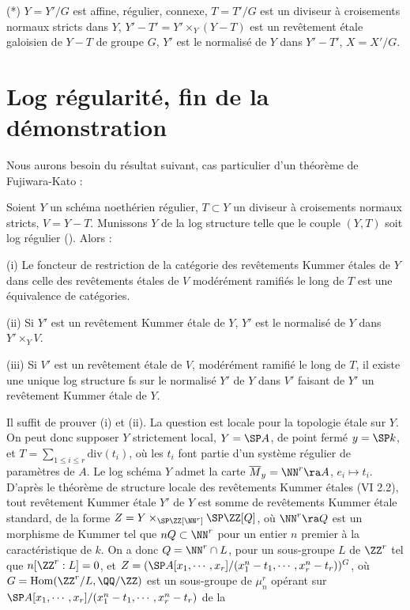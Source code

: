 \documentclass[10pt]{../fichiers-configuration-latex/smfart}
\begin{document}
(*) $Y = Y'/G$ est affine, régulier, connexe, $T = T'/G$ est un diviseur à croisements normaux
stricts dans $Y$, $Y'-T' = Y' \times _Y (Y-T)$ est un revêtement étale galoisien de $Y-T$ de groupe
$G$, $Y'$ est le normalisé de $Y$ dans $Y'-T'$, $X = X'/G$.  \section{Log régularité, fin de la
démonstration} Nous aurons besoin du résultat suivant, cas particulier d'un théorème de
Fujiwara-Kato \cite[3.1]{FK@Fujiwara-Kato}: \begin{proposition}\label{9-FK} Soient $Y$ un schéma
noethérien régulier, $T \subset  Y$ un diviseur à croisements normaux stricts, $V = Y-T$. Munissons
$Y$ de la log structure telle que le couple $(Y,T)$ soit log régulier (). Alors :

(i) Le foncteur de restriction de la catégorie des revêtements Kummer étales de $Y$ dans celle des
revêtements étales de $V$ modérément ramifiés le long de $T$ est une équivalence de catégories. 

(ii) Si $Y'$ est un revêtement Kummer étale de $Y$, $Y'$ est le normalisé de $Y$ dans $Y' \times_Y
V$. 

(iii) Si $V'$ est un revêtement étale de $V$, modérément ramifié le long de $T$, il existe une
unique log structure fs sur le normalisé $Y'$ de $Y$ dans $V'$ faisant de $Y'$ un revêtement Kummer
étale de $Y$.  \end{proposition} Il suffit de prouver (i) et (ii). La question est locale pour la
topologie étale sur $Y$. On peut donc supposer $Y$ strictement local, $Y = \SP A$, de point fermé $y
= \SP k$, et $T = \sum_{1 \le i \le r}\mathrm{div}(t_i)$, où les $t_i$ font partie d'un système
régulier de paramètres de $A$.  Le log schéma $Y$ admet la carte $\overline{M}_{y} = \NN^r \ra A$,
$e_i \mapsto t_i$. D'après le théorème de structure locale des revêtements Kummer étales (VI 2.2),
tout revêtement Kummer étale $Y'$ de $Y$ est somme de revêtements Kummer étale standard, de la forme
$Z = Y \times_{\SP \ZZ[\NN^r]} \SP \ZZ[Q]$, où $\NN^r \ra Q$ est un morphisme de Kummer tel que $nQ
\subset \NN^r$ pour un entier $n$ premier à la caractéristique de $k$. On a donc $Q = \NN^r \cap L$,
pour un sous-groupe $L$ de $\ZZ^r$ tel que $n[\ZZ^r : L] = 0$, et $Z = (\SP
A[x_1,\cdots,x_r]/(x_1^n-t_1,\cdots,x_r^n-t_r))^G$, où $G = \mathrm{Hom}(\ZZ^r/ L,\QQ/\ZZ)$ est un
sous-groupe de $\mu_n^r$ opérant sur $\SP A[x_1,\cdots,x_r]/(x_1^n-t_1,\cdots,x_r^n-t_r)$ de la
\end{document}
